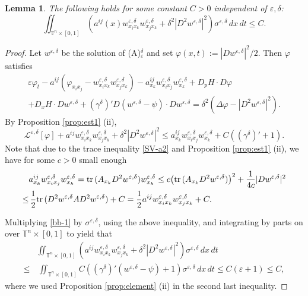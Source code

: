 \documentclass[12pt,reqno]{amsart}
\theoremstyle{plain}
\newtheorem{lem}[thm]{Lemma}
\theoremstyle{remark}
\numberwithin{equation}{section}
\begin{document}
\begin{lem}\label{lem:est2}
The following holds for some constant $C>0$ independent of ${\varepsilon},{\delta}$:
\[
\iint_{{\mathbb{T}}^n\times[0,1]}
\left(a^{ij}(x)w^{{\varepsilon},{\delta}}_{x_ix_k}w^{{\varepsilon},{\delta}}_{x_jx_k}+
{\delta}^{2}|D^{2}w^{{\varepsilon},{\delta}}|^2\right) {\sigma}^{{\varepsilon},{\delta}}\,dx\,dt\le C. 
\]
\end{lem}
\begin{proof}
Let $w^{{\varepsilon}, {\delta}}$ be the solution of (A)$_{\varepsilon}^{\delta}$
and set $\varphi(x,t):=|Dw^{{\varepsilon}, {\delta}}|^2/2$.  
Then $\varphi$ satisfies 
\begin{multline*}
{\varepsilon}\varphi_t
-a^{ij}(\varphi_{x_ix_j}-w_{x_ix_k}^{{\varepsilon},{\delta}} w_{x_jx_k}^{{\varepsilon},{\delta}} )
-a^{ij}_{x_k}w_{x_ix_j}^{{\varepsilon},{\delta}} w_{x_k}^{{\varepsilon},{\delta}}
+D_pH\cdot D\varphi\\
+D_xH\cdot Dw^{{\varepsilon},{\delta}}
+({\gamma}^{\delta})'D(w^{{\varepsilon},{\delta}}-\psi)\cdot Dw^{{\varepsilon},{\delta}}
= 
{\delta}^2({\Delta}\varphi-|D^2 w^{{\varepsilon},{\delta}}|^2).  
\end{multline*}
By Proposition \ref{prop:est1} (ii), 
\begin{equation}\label{bb-1}
{\mathcal{L}}^{{\varepsilon},{\delta}}[\varphi]
+a^{ij}w_{x_ix_k}^{{\varepsilon},{\delta}} w_{x_jx_k}^{{\varepsilon},{\delta}}
+{\delta}^{2}|D^2 w^{{\varepsilon},{\delta}}|^2
\le
a^{ij}_{x_k}w_{x_ix_j}^{{\varepsilon},{\delta}} w_{x_k}^{{\varepsilon},{\delta}}
+
C(({\gamma}^{\delta})'+1). 
\end{equation} 
Note that due to the trace inequality \eqref{SV-a2} and Proposition \ref{prop:est1} (ii), 
we have for some $c>0$ small enough
\begin{align*}
&a^{ij}_{x_k}w^{{\varepsilon},{\delta}}_{x_ix_j}w^{{\varepsilon},{\delta}}_{x_k}
={{\rm tr}\,}(A_{x_k}D^2 w^{{\varepsilon},{\delta}})w^{{\varepsilon},{\delta}}_{x_k}
\leq c \big({{\rm tr}\,}(A_{x_k}D^2 w^{{\varepsilon},{\delta}})\big)^2
+\frac{1}{4c}|Dw^{{\varepsilon},{\delta}}|^2\\ 
\leq&\, 
\frac{1}{2} {{\rm tr}\,}(D^2 w^{{\varepsilon},{\delta}}A D^2 w^{{\varepsilon},{\delta}})+C
=\frac{1}{2}a^{ij} w^{{\varepsilon},{\delta}}_{x_i x_k} w^{{\varepsilon},{\delta}}_{x_j x_k}+C.
\end{align*}

Multiplying \eqref{bb-1} by ${\sigma}^{{\varepsilon},{\delta}}$, using the above inequality, and integrating by parts on over ${\mathbb{T}}^n\times[0,1]$ to yield that
\begin{align*}
&\iint_{{\mathbb{T}}^n\times[0,1]} 
\left(a^{ij}w_{x_ix_k}^{{\varepsilon},{\delta}} w_{x_jx_k}^{{\varepsilon},{\delta}}
+{\delta}^{2}|D^2 w^{{\varepsilon},{\delta}}|^2\right)
{\sigma}^{{\varepsilon},{\delta}}\,dx\,dt\\
\le &\, 
\iint_{{\mathbb{T}}^n\times[0,1]} C(({\gamma}^{\delta})'(w^{{\varepsilon},{\delta}}-\psi)+1){\sigma}^{{\varepsilon},{\delta}}\,dx\,dt
\le C({\varepsilon}+1) \le C, 
\end{align*}
where we used Proposition \ref{prop:element} (ii) in the second last inequality.
\end{proof}
\end{document}
